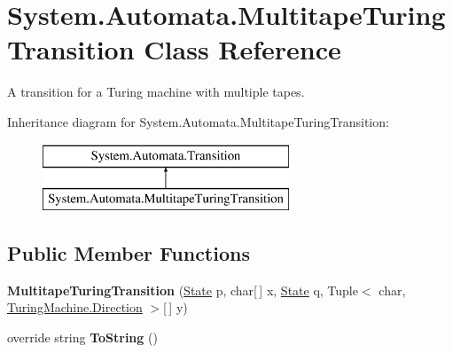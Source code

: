 \hypertarget{class_system_1_1_automata_1_1_multitape_turing_transition}{}\section{System.\+Automata.\+Multitape\+Turing\+Transition Class Reference}
\label{class_system_1_1_automata_1_1_multitape_turing_transition}


A transition for a Turing machine with multiple tapes.  


Inheritance diagram for System.\+Automata.\+Multitape\+Turing\+Transition\+:\begin{figure}[H]
\begin{center}
\leavevmode
\includegraphics[height=2.000000cm]{class_system_1_1_automata_1_1_multitape_turing_transition}
\end{center}
\end{figure}
\subsection*{Public Member Functions}
\begin{DoxyCompactItemize}
\item 
\mbox{\label{class_system_1_1_automata_1_1_multitape_turing_transition_a0f5fb925d5e90421e8e8233fb4cad694}} 
{\bfseries Multitape\+Turing\+Transition} (\mbox{\hyperlink{class_system_1_1_automata_1_1_state}{State}} p, char\mbox{[}$\,$\mbox{]} x, \mbox{\hyperlink{class_system_1_1_automata_1_1_state}{State}} q, Tuple$<$ char, \mbox{\hyperlink{class_system_1_1_automata_1_1_turing_machine_aa253c3820befa3cfdd3d17b2d8fdd2d9}{Turing\+Machine.\+Direction}} $>$\mbox{[}$\,$\mbox{]} y)
\item 
\mbox{\label{class_system_1_1_automata_1_1_multitape_turing_transition_a2b2fdf9244fbe35e2537c56ed745b1d1}} 
override string {\bfseries To\+String} ()
\end{DoxyCompactItemize}
